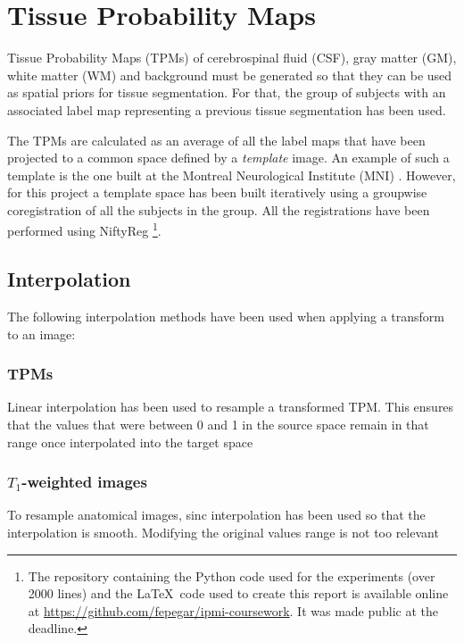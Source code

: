 \section{Tissue Probability Maps}



Tissue Probability Maps (TPMs) of cerebrospinal fluid (CSF), gray matter (GM), white matter (WM) and background must be generated so that they can be used as spatial priors for tissue segmentation. For that, the group of subjects with an associated label map representing a previous tissue segmentation has been used.


The TPMs are calculated as an average of all the label maps that have been projected to a common space defined by a \textit{template} image. An example of such a template is the one built at the Montreal Neurological Institute (MNI) \cite{evans_3d_1993}. However, for this project a template space has been built iteratively using a groupwise coregistration of all the subjects in the group. All the registrations have been performed using NiftyReg \cite{modat_global_2014}\footnote{The repository containing the Python code used for the experiments (over 2000 lines) and the \LaTeX\ code used to create this report is available online at \href{https://github.com/fepegar/ipmi-coursework}{https://github.com/fepegar/ipmi-coursework}. It was made public at the deadline.}.


\subsection{Interpolation}
The following interpolation methods have been used when applying a transform to an image:

\subsubsection{TPMs}
Linear interpolation has been used to resample a transformed TPM. This ensures that the values that were between 0 and 1 in the source space remain in that range once interpolated into the target space

\subsubsection{$T_1$-weighted images} To resample anatomical images, sinc interpolation has been used so that the interpolation is smooth. Modifying the original values range is not too relevant

